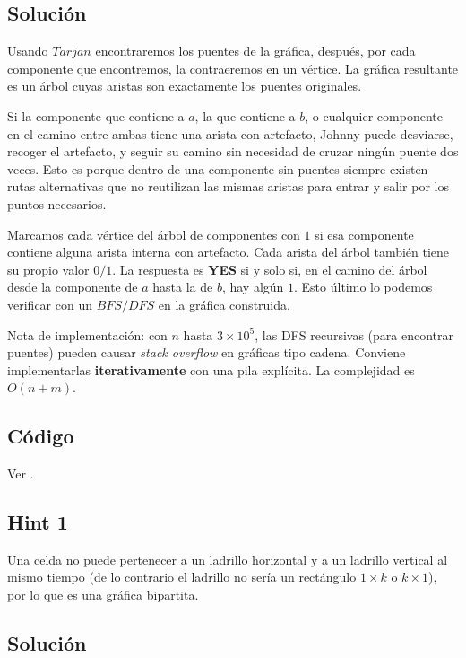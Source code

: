 \subsection*{Solución}

Usando $Tarjan$ encontraremos los puentes de la gráfica, después, por cada componente que encontremos, la contraeremos en un vértice. La gráfica resultante es un árbol cuyas aristas son exactamente los puentes
originales.

Si la componente que contiene a $a$, la que contiene a $b$, o cualquier componente en el camino entre ambas tiene una arista con artefacto, Johnny puede desviarse, recoger el artefacto, y seguir su camino sin necesidad de cruzar ningún puente dos veces. Esto es porque dentro de una componente sin puentes siempre existen rutas alternativas que no reutilizan las mismas aristas para entrar y salir por los puntos necesarios.

Marcamos cada vértice del árbol de componentes con $1$ si esa componente contiene alguna arista interna con artefacto. Cada arista del árbol también tiene su propio valor $0/1$. La respuesta es \textbf{YES} si y solo si, en el camino del árbol desde la componente de $a$ hasta la de $b$, hay algún $1$. Esto último lo podemos verificar con un $BFS/DFS$ en la gráfica construida.

Nota de implementación: con $n$ hasta $3\times10^5$, las DFS recursivas (para encontrar puentes) pueden causar \textit{stack overflow} en gráficas tipo cadena. Conviene implementarlas \textbf{iterativamente} con una pila explícita. La complejidad es $O(n+m)$.

\subsection*{Código}
Ver .


\subsection*{Hint 1}
Una celda no puede pertenecer a un ladrillo horizontal y a un ladrillo
vertical al mismo tiempo (de lo contrario el ladrillo no sería un
rectángulo $1\times k$ o $k\times 1$), por lo que es una gráfica bipartita.

\subsection*{Solución}

